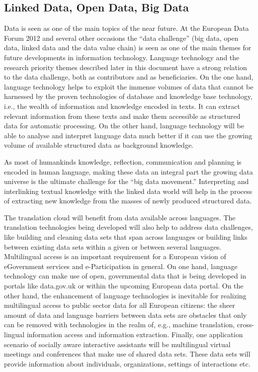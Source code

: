 \begin{multicols}{2}
\subsection{Linked Data, Open Data, Big Data}
\label{sec:linked-data-open}

Data is seen as one of the main topics of the near future. At the European Data Forum 2012 and several other occasions the “data challenge” (big data, open data, linked data and the data value chain) is seen as one of the main themes for future developments in information technology. Language technology and the research priority themes described later in this document have a strong relation to the data challenge, both as contributors and as beneficiaries. On the one hand, language technology helps to exploit the immense volumes of data that cannot be harnessed by the proven technologies of database and knowledge base technology, i.e., the wealth of information and knowledge encoded in texts. It can extract relevant information from these texts and make them accessible as structured data for automatic processing. On the other hand, language technology will be able to analyse and interpret language data much better if it can use the growing volume of available structured data as background knowledge. 

As most of humankinds knowledge, reflection, communication and planning is encoded in human language, making these data an integral part the growing data universe is the ultimate challenge for the “big data movement.”  Interpreting and interlinking textual knowledge with the linked data world will help in the process of extracting new knowledge from the masses of newly produced structured data. 

The translation cloud will benefit from data available across languages. The translation technologies being developed will also help to address data challenges, like building and cleaning data sets that span across languages or building links between existing data sets within a given or between several languages. Multilingual access is an important requirement for a European vision of eGovernment services and e-Participation in general. On one hand, language technology can make use of open, governmental data that is being developed in portals like data.gov.uk or within the upcoming European data portal. On the other hand, the enhancement of language technologies is inevitable for realizing multilingual access to public sector data for all European citizens: the sheer amount of data and language barriers between data sets are obstacles that only can be removed with technologies in the realm of, e.g., machine translation, cross-lingual information access and information extraction. Finally,  one application scenario of socially aware interactive assistants will be multilingual virtual meetings and conferences that make use of shared data sets. These data sets will provide information about individuals, organizations, settings of interactions etc.


\end{multicols}
